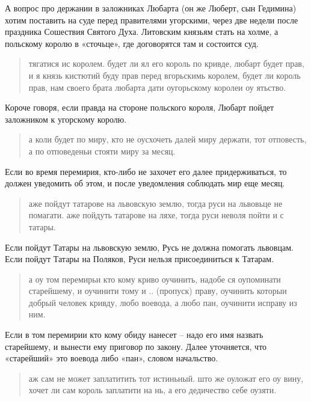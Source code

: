 А вопрос про держании в заложниках Любарта (он же Люберт, сын Гедимина) хотим поставить на суде перед правителями угорскими, через две недели после праздника Сошествия Святого Духа. Литовским князьям стать на холме, а польскому королю в «сточьце», где договорятся там и состоится суд.

\begin{quotation}
тягатися ис королем. будет ли ял его король по кривде, любарт будет прав, и я князь кистютий буду прав перед вгорьскимь королем, будет ли король прав, нам своего брата любарта дати оугорьскому королеи оу ятьство.
\end{quotation}

Короче говоря, если правда на стороне польского короля, Любарт пойдет заложником к угорскому королю.

\begin{quotation}
а коли будет по миру, кто не оусхочеть далей миру держати, тот отповесть, а по отповеденьи стояти миру за месяц.
\end{quotation}

Если во время перемирия, кто-либо не захочет его далее придерживаться, то должен уведомить об этом, и после уведомления соблюдать мир еще месяц.

\begin{quotation}
аже пойдут татарове на львовскую землю, тогда руси на львовьце не помагати. аже пойдуть татарове на ляхе, тогда руси неволя пойти и с татары.
\end{quotation}

Если пойдут Татары на львовскую землю, Русь не должна помогать львовцам. Если пойдут Татары на Поляков, Руси нельзя присоединиться к Татарам.

\begin{quotation}
а оу том перемирьи кто кому криво оучинить, надобе ся оупоминати старейшему, и оучинити тому и .. (пропуск) праву, оучинить которыи добрый человек кривду, любо воевода, а любо пан, оучинити исправу из ним.
\end{quotation}

Если в том перемирии кто кому обиду нанесет – надо его имя назвать старейшему, и вынести ему приговор по закону. Далее уточняется, что «старейший» это воевода либо «пан», словом начальство. 

\begin{quotation}
аж сам не может заплатитить тот истиньный. што же оуложат его оу вину, хочет ли сам король заплатити на нь, а его дедичество себе оузяти.
\end{quotation}

